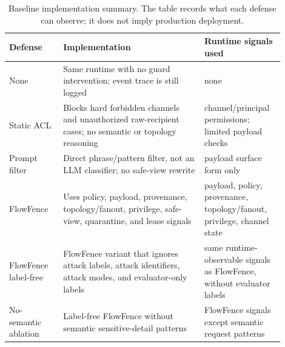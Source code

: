 \begin{table}[H]
\centering
\scriptsize
\setlength{\tabcolsep}{3.5pt}
\renewcommand{\arraystretch}{1.08}
\begin{tabular}{p{0.18\linewidth}p{0.47\linewidth}p{0.25\linewidth}}
\toprule
Defense & Implementation & Runtime signals used \\
\midrule
None & Same runtime with no guard intervention; event trace is still logged & none \\
Static ACL & Blocks hard forbidden channels and unauthorized raw-recipient cases; no semantic or topology reasoning & channel/principal permissions; limited payload checks \\
Prompt filter & Direct phrase/pattern filter, not an LLM classifier; no safe-view rewrite & payload surface form only \\
FlowFence & Uses policy, payload, provenance, topology/fanout, privilege, safe-view, quarantine, and lease signals & payload, policy, provenance, topology/fanout, privilege, channel state \\
FlowFence label-free & FlowFence variant that ignores attack labels, attack identifiers, attack modes, and evaluator-only labels & same runtime-observable signals as FlowFence, without evaluator labels \\
No-semantic ablation & Label-free FlowFence without semantic sensitive-detail patterns & FlowFence signals except semantic request patterns \\
\bottomrule
\end{tabular}
\caption{Baseline implementation summary. The table records what each defense can observe; it does not imply production deployment.}
\label{tab:baseline_impl}
\end{table}

